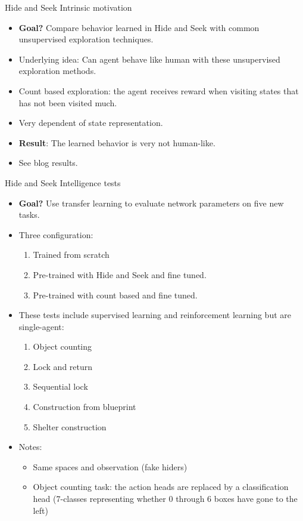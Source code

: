 \documentclass[9pt, hyperref={pdfusetitle,colorlinks=true,allcolors=DarkBlue}]{beamer}
\begin{document}
\begin{frame}{Hide and Seek Intrinsic motivation}
    \begin{itemize}
        \item \textbf{Goal?} Compare behavior learned in Hide and Seek with common unsupervised exploration techniques.
        \vfill
        \item Underlying idea: Can agent behave like human with these unsupervised exploration methods.
        \vfill
        \item Count based exploration: the agent receives reward when visiting states that has not been visited much.
        \vfill
        \item Very dependent of state representation.
        \vfill
        \item \textbf{Result}: The learned behavior is very not human-like.
        \vfill
        \item See blog results.
    \end{itemize}{}
\end{frame}{}

\begin{frame}{Hide and Seek Intelligence tests}
    \begin{itemize}
        \item \textbf{Goal?} Use transfer learning to evaluate network parameters on five new tasks.
        \item Three configuration:
        \begin{enumerate}
            \item Trained from scratch
            \item Pre-trained with Hide and Seek and fine tuned.
            \item Pre-trained with count based and fine tuned.
        \end{enumerate}{}
        \item These tests include supervised learning and reinforcement learning but are single-agent: 
        \begin{enumerate}
            \item Object counting
            \item Lock and return
            \item Sequential lock
            \item Construction from blueprint
            \item Shelter construction
        \end{enumerate}{}
        \item Notes:
        \begin{itemize}
        \item Same spaces and observation (fake hiders)
        \item Object counting task: the action heads are replaced by a classification head (7-classes representing whether 0 through 6 boxes have gone to the left)
        \end{itemize}{}
    \end{itemize}{}
\end{frame}{}
\end{document}
